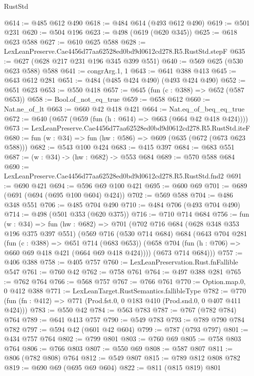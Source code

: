 \begin{lexlean}{RustStd}
\begin{coremodule}
@614 := @485 @612 @490
@618 := @484 @614 (@493 @612 @490)
@619 := @501 @231
@620 := @504 @196
@623 := @498 (@619 (@620 @345))
@625 := @618 @623 @588
@627 := @610 @625 @588
@628 := LexLeanPreserve.Cae4456d77aa62528ed0bd9d0612cd278.R5.RustStd.stepF
@635 := @627 (@628 @217 @231 @196 @345 @399 @551)
@640 := @569 @625 (@530 @623 @588) @588
@641 := congrArg.{1, 1}
@643 := @641 @388 @413
@645 := @643 @612 @281
@651 := @484 (@485 @424 @490) (@493 @424 @490)
@652 := @651 @623
@653 := @550 @418
@657 := @645 (fun (c : @388) => @652 (@587 @653))
@658 := Bool.of_not_eq_true
@659 := @658 @612
@660 := Nat.ne_of_lt
@663 := @660 @42 @418 @421
@664 := Nat.eq_of_beq_eq_true
@672 := @640 (@657 (@659 (fun (h : @614) => @663 (@664 @42 @418 @424))))
@673 := LexLeanPreserve.Cae4456d77aa62528ed0bd9d0612cd278.R5.RustStd.iteF
@680 := fun (w : @34) => fun (hw : @586) => @609 (@635 (@672 (@673 @623 @588)))
@682 := @543 @100 @424
@683 := @415 @397
@684 := @683 @551
@687 := (w : @34) -> (hw : @682) -> @553 @684
@689 := @570 @588 @684
@690 := LexLeanPreserve.Cae4456d77aa62528ed0bd9d0612cd278.R5.RustStd.fnd2
@691 := @690 @421
@694 := @596 @69 @100 @421
@695 := @600 @69
@701 := @689 (@691 (@694 (@695 @100 @604) @424))
@702 := @569 @588
@704 := @486 @348 @551
@706 := @485 @704 @490
@710 := @484 @706 (@493 @704 @490)
@714 := @498 (@501 @353 (@620 @375))
@716 := @710 @714 @684
@756 := fun (w : @34) =>
  fun (hw : @682) =>
  @701
    (@702
      @716
      @684
      (@628 @348 @353 @196 @375 @397 @551)
      (@569
        @716
        (@530 @714 @684)
        @684
        (@643
          @704
          @281
          (fun (c : @388) => @651 @714 (@683 @653))
          (@658 @704 (fun (h : @706) => @660 @69 @418 @421 (@664 @69 @418 @424))))
        (@673 @714 @684)))
@757 := @406 @388
@758 := @405 @757
@760 := LexLeanPreservation.Rust.fnFallible @547
@761 := @760 @42
@762 := @758 @761
@764 := @497 @388 @281
@765 := @762 @764
@766 := @568 @757
@767 := @766 @761
@770 := Option.map.{0, 0} @412 @388
@771 := LexLeanTarget.RustSemantics.fallibleType
@782 := @770 (fun (fn : @412) => @771 (Prod.fst.{0, 0} @183 @410 (Prod.snd.{0, 0} @407 @411 @424)))
@783 := @550 @42
@784 := @563 @783
@787 := @767 (@782 @784) @764
@789 := @641 @413 @757
@790 := @549 @783
@793 := @789 @790 @784 @782
@797 := @594 @42 (@601 @42 @604)
@799 := @787 (@793 @797)
@801 := @434 @757 @764
@802 := @799 @801
@803 := @760 @69
@805 := @758 @803 @764
@806 := @766 @803
@807 := @550 @69
@808 := @587 @807
@811 := @806 (@782 @808) @764
@812 := @549 @807
@815 := @789 @812 @808 @782
@819 := @690 @69 (@695 @69 @604)
@822 := @811 (@815 @819) @801

\end{coremodule}
\end{lexlean}
